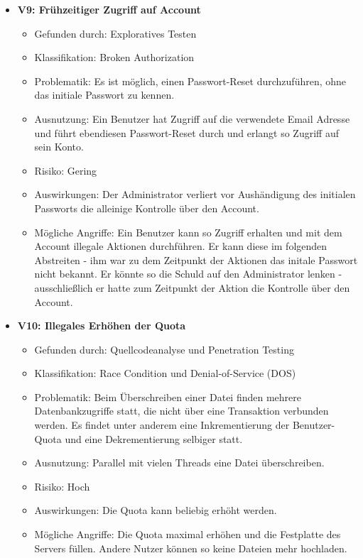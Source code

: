 \documentclass[12pt,DIV14,BCOR10mm,a4paper,parskip=half-,headsepline,headinclude,english,ngerman,bibliography=totocnumbered]{scrreprt}
\begin{document}
\begin{itemize}
  \hypertarget{vulnerability9}{}
  \item \textbf{V9: Frühzeitiger Zugriff auf Account}
  \begin{itemize}
  \item Gefunden durch: Exploratives Testen
  \item Klassifikation: Broken Authorization
  \item Problematik: Es ist möglich, einen Passwort-Reset durchzuführen, ohne das initiale Passwort zu kennen.
  \item Ausnutzung: Ein Benutzer hat Zugriff auf die verwendete Email Adresse und führt ebendiesen Passwort-Reset durch und erlangt so Zugriff auf sein Konto.
  \item Risiko: Gering
  \item Auswirkungen: Der Administrator verliert vor Aushändigung des initialen Passworts die alleinige Kontrolle über den Account.
  \item Mögliche Angriffe: Ein Benutzer kann so Zugriff erhalten und mit dem Account illegale Aktionen durchführen. Er kann diese im folgenden Abstreiten - ihm war zu dem Zeitpunkt der Aktionen das initale Passwort nicht bekannt. Er könnte so die Schuld auf den Administrator lenken - ausschließlich er hatte zum Zeitpunkt der Aktion die Kontrolle über den Account. 
  \end{itemize}

  \hypertarget{vulnerability10}{}
  \item \textbf{V10: Illegales Erhöhen der Quota}
  \begin{itemize}
  \item Gefunden durch: Quellcodeanalyse und Penetration Testing
  \item Klassifikation: Race Condition und Denial-of-Service (DOS)
  \item Problematik: Beim Überschreiben einer Datei finden mehrere Datenbankzugriffe statt, die nicht über eine Transaktion verbunden werden. Es findet unter anderem eine Inkrementierung der Benutzer-Quota und eine Dekrementierung selbiger statt.
  \item Ausnutzung: Parallel mit vielen Threads eine Datei überschreiben.
  \item Risiko: Hoch
  \item Auswirkungen: Die Quota kann beliebig erhöht werden.
  \item Mögliche Angriffe: Die Quota maximal erhöhen und die Festplatte des Servers füllen. Andere Nutzer können so keine Dateien mehr hochladen.
  \end{itemize}


\end{itemize}
\end{document}
